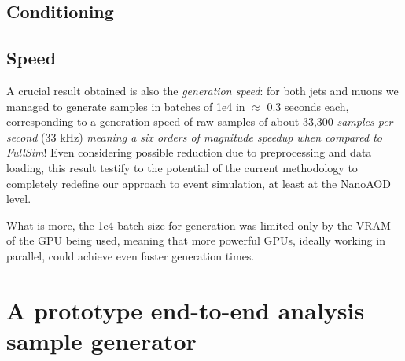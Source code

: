 \subsection{Conditioning}

\subsection{Speed}

A crucial result obtained is also the \emph{generation speed}: for both jets and muons we managed to generate samples in batches of 1e4 in $\approx$ 0.3 seconds each, corresponding to a generation speed of raw samples of about 33,300 \emph{samples per second} (33 kHz) \emph{meaning a six orders of magnitude speedup when compared to FullSim}! Even considering possible reduction due to preprocessing and data loading, this result testify to the potential of the current methodology to completely redefine our approach to event simulation, at least at the NanoAOD level.

What is more, the 1e4 batch size for generation was limited only by the VRAM of the GPU being used, meaning that more powerful GPUs, ideally working in parallel, could achieve even faster generation times.


\section{A prototype end-to-end analysis sample generator}
